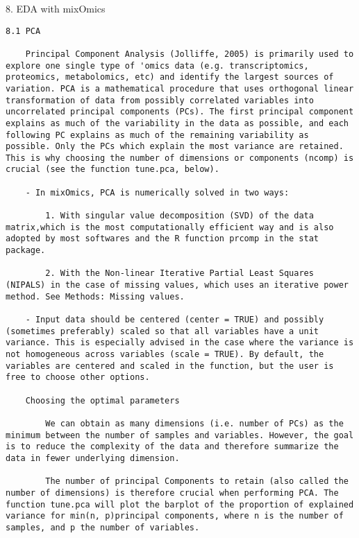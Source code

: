 \documentclass[
]{book}
\begin{document}
8. EDA with mixOmics

\begin{verbatim}
8.1 PCA

    Principal Component Analysis (Jolliffe, 2005) is primarily used to explore one single type of 'omics data (e.g. transcriptomics, proteomics, metabolomics, etc) and identify the largest sources of variation. PCA is a mathematical procedure that uses orthogonal linear transformation of data from possibly correlated variables into uncorrelated principal components (PCs). The first principal component explains as much of the variability in the data as possible, and each following PC explains as much of the remaining variability as possible. Only the PCs which explain the most variance are retained. This is why choosing the number of dimensions or components (ncomp) is crucial (see the function tune.pca, below).

    - In mixOmics, PCA is numerically solved in two ways:

        1. With singular value decomposition (SVD) of the data matrix,which is the most computationally efficient way and is also adopted by most softwares and the R function prcomp in the stat package.

        2. With the Non-linear Iterative Partial Least Squares (NIPALS) in the case of missing values, which uses an iterative power method. See Methods: Missing values.

    - Input data should be centered (center = TRUE) and possibly (sometimes preferably) scaled so that all variables have a unit variance. This is especially advised in the case where the variance is not homogeneous across variables (scale = TRUE). By default, the variables are centered and scaled in the function, but the user is free to choose other options.

    Choosing the optimal parameters

        We can obtain as many dimensions (i.e. number of PCs) as the minimum between the number of samples and variables. However, the goal is to reduce the complexity of the data and therefore summarize the data in fewer underlying dimension.

        The number of principal Components to retain (also called the number of dimensions) is therefore crucial when performing PCA. The function tune.pca will plot the barplot of the proportion of explained variance for min(n, p)principal components, where n is the number of samples, and p the number of variables.


\end{verbatim}
\end{document}

